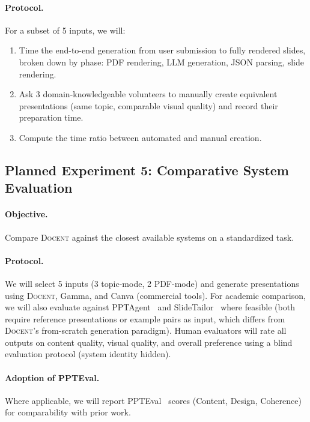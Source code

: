 \documentclass[11pt,a4paper]{article}
\newcommand{\system}{\textsc{Docent}\xspace}
\begin{document}
\paragraph{Protocol.}
For a subset of 5 inputs, we will:

\begin{enumerate}[leftmargin=*,nosep]
    \item Time the end-to-end generation from user submission to fully rendered slides, broken down by phase: PDF rendering, LLM generation, JSON parsing, slide rendering.
    \item Ask 3 domain-knowledgeable volunteers to manually create equivalent presentations (same topic, comparable visual quality) and record their preparation time.
    \item Compute the time ratio between automated and manual creation.
\end{enumerate}

\subsection{Planned Experiment 5: Comparative System Evaluation}
\label{sec:eval-comparison}

\paragraph{Objective.}
Compare \system against the closest available systems on a standardized task.

\paragraph{Protocol.}
We will select 5 inputs (3 topic-mode, 2 PDF-mode) and generate presentations using \system, Gamma, and Canva (commercial tools).
For academic comparison, we will also evaluate against PPTAgent~\citep{zheng2025pptagent} and SlideTailor~\citep{zeng2026slidetailor} where feasible (both require reference presentations or example pairs as input, which differs from \system's from-scratch generation paradigm).
Human evaluators will rate all outputs on content quality, visual quality, and overall preference using a blind evaluation protocol (system identity hidden).

\paragraph{Adoption of PPTEval.}
Where applicable, we will report PPTEval~\citep{zheng2025pptagent} scores (Content, Design, Coherence) for comparability with prior work.
\end{document}

